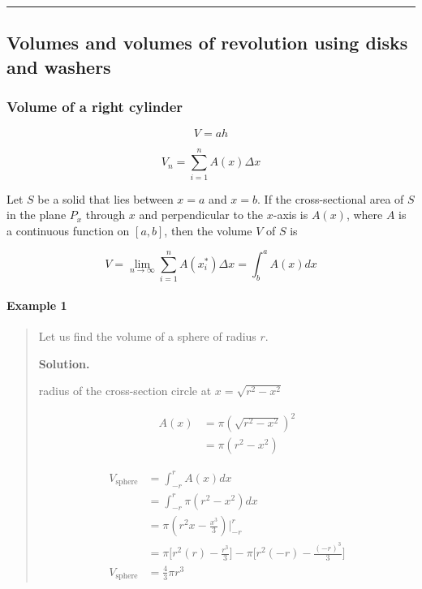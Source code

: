 \documentclass[
]{article}
\begin{document}
\begin{center}\rule{0.5\linewidth}{0.5pt}\end{center}

\hypertarget{volumes-and-volumes-of-revolution-using-disks-and-washers}{%
\subsection{Volumes and volumes of revolution using disks and
washers}\label{volumes-and-volumes-of-revolution-using-disks-and-washers}}

\hypertarget{volume-of-a-right-cylinder}{%
\subsubsection{Volume of a right
cylinder}\label{volume-of-a-right-cylinder}}

\[ V = ah \]

\[ V_n = \sum_{i=1}^n A(x)\Delta x \]

Let \(S\) be a solid that lies between \(x=a\) and \(x=b\). If the
cross-sectional area of \(S\) in the plane \(P_x\) through \(x\) and
perpendicular to the \(x\)-axis is \(A(x)\), where \(A\) is a continuous
function on \([a,b]\), then the volume \(V\) of \(S\) is

\[ V = \lim_{n \to\infty} \sum_{i=1}^n A(x_i^*)\Delta x = \int_b^a A(x)dx \]

\hypertarget{example-1-2}{%
\paragraph*{Example 1}\label{example-1-2}}

\begin{quote}
Let us find the volume of a sphere of radius \(r\).

\textbf{Solution.}

radius of the cross-section circle at \(x = \sqrt{r^2-x^2}\)

\begin{align*}
A(x) &= \pi (\sqrt{r^2-x^2})^2\\
&= \pi (r^2-x^2)
\end{align*}

\begin{align*}
V_{\text{sphere}} &= \int_{-r}^r A(x)dx \\
&= \int_{-r}^r \pi (r^2-x^2) dx \\
&= \pi(r^2x - \frac{x^3}{3})\Big|_{-r}^r \\
&= \pi\Bigg[r^2(r) - \frac{r^3}{3}\Bigg] - \pi\Bigg[r^2(-r) - \frac{(-r)^3}{3}\Bigg] \\
V_{\text{sphere}} &= \frac{4}{3}\pi r^3
\end{align*}
\end{quote}
\end{document}
